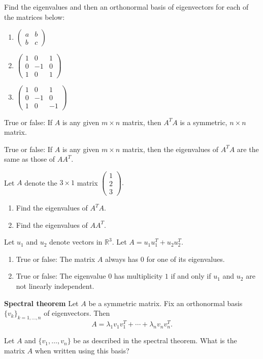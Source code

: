 \documentclass[12pt,letterpaper]{article}
\begin{document}
\begin{enumerate}
\Problem Find the eigenvalues and then an orthonormal basis of eigenvectors for each of the matrices below:
\begin{enumerate}
    \item[a)] 
    $
    \begin{pmatrix}
    a & b \\
    b & c
    \end{pmatrix}
    $\vfill
    \item[b)] 
    $
    \begin{pmatrix}
    1 & 0 & 1 \\
    0 & -1 & 0 \\
    1 & 0 & 1
    \end{pmatrix}
    $\vfill
    \item[c)] 
    $
    \begin{pmatrix}
    1 & 0 & 1 \\
    0 & -1 & 0 \\
    1 & 0 & -1
    \end{pmatrix}
   $\vfill
\end{enumerate}


\newpage

\Problem True or false: If $A$ is any given $m \times n$ matrix, then $A^TA$ is a symmetric, $n \times n$ matrix.
\vfill

\Problem
True or false: If $A$ is any given $m \times n$ matrix, then the eigenvalues of $A^TA$ are the same as those of $AA^T.$
\vfill

\Problem
Let $A$ denote the $3 \times 1$ matrix
$
\begin{pmatrix}
1 \\
2 \\
3
\end{pmatrix}.
$
\begin{enumerate}
    \item[a)] Find the eigenvalues of $A^TA.$\vfill
    \item[b)] Find the eigenvalues of $AA^T.$
\end{enumerate}

\vfill

\newpage
\Problem
Let $u_1$ and $u_2$ denote vectors in $\mathbb{R}^3.$ Let $A = u_1u_1^T + u_2u_2^T.$

\begin{enumerate}
    \item[a)] True or false: The matrix $A$ always has $0$ for one of its eigenvalues.\vfill
    \item[b)] True or false: The eigenvalue $0$ has multiplicity $1$ if and only if $u_1$ and $u_2$ are not linearly independent.\vfill
\end{enumerate}

\Problem \textbf{Spectral theorem}
Let $A$ be a symmetric matrix. Fix an orthonormal basis $\{v_k\}_{k=1,\dots,n}$ of eigenvectors. Then
\[
A = \lambda_1 v_1v_1^T + \cdots + \lambda_nv_nv_n^T.
\]

Let $A$ and $\{v_1, \dots, v_n\}$ be as described in the spectral theorem. What is the matrix $A$ when written using this basis?
\vfill

\end{enumerate}
\end{document}
